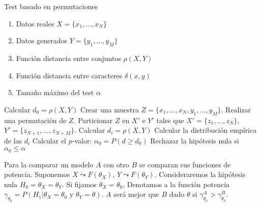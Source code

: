 \begin{algorithm}
	\caption{Test basado en permutaciones}
	\label{alg:TBP}
	\begin{algorithmic}[1]
	\REQUIRE
		\begin{enumerate}[a]
		\item Datos reales $X = \{ x_1, \dots, x_N \}$
		\item Datos generados $Y = \{ y_1, \dots, y_M \}$
		\item Función distancia entre conjuntos $\rho(X,Y)$
		\item Función distancia entre caracteres $\delta(x,y)$
		\item Tamaño máximo del test $\alpha$
		\end{enumerate}
		\STATE Calcular $d_0 = \rho(X,Y)$
		\STATE Crear una muestra $Z= \{x_1, \dots, x_N, y_1, \dots, y_M \}$.
			\STATE Realizar una permutación de $Z$.
			\STATE Particionar $Z$ en $X'$ e $Y'$ tales que $X' = \{ z_1, \dots, z_N \}$, $Y' = \{ z_{N+1}, \dots, z_{N+M} \} $.
			\STATE Calcular $d_i = \rho(X,Y)$
		\ENDFOR
		\STATE Calcular la distribución empírica de las $d_i$
		\STATE Calcular el $p$-valor: $\alpha_0 = P(d \geq d_0)$
		\STATE Rechazar la hipótesis nula si $\alpha_0 \leq \alpha$
	\end{algorithmic}
\end{algorithm}

	Para la comparar un modelo $A$ con otro $B$ se comparan sus funciones de potencia. Suponemos $X \leadsto F(\theta_X)$, $Y \leadsto F(\theta_Y)$. Consideraremos la hipótesis nula $H_0 = \theta_X = \theta_Y$. Si fijamos $\theta_X= \theta_0$, Denotamos a la función potencia $\gamma_{\theta_0}= P(H_1 | \theta_X = \theta_0 \text{ y } \theta_Y = \theta)$. $A$ será mejor que $B$ dado $\theta$ si $\gamma_{\theta_0}^A  >\gamma_{\theta_0}^B$.
	
